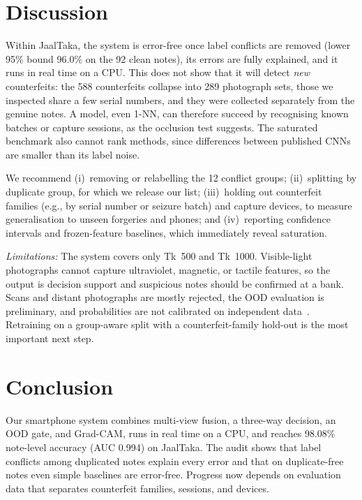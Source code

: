 \documentclass[journal,onecolumn]{IEEEtran}
\begin{document}
\FloatBarrier
\section{Discussion}
\label{sec:discussion}

Within JaalTaka, the system is error-free once label conflicts are removed (lower 95\%
bound 96.0\% on the 92 clean notes), its errors are fully explained, and it runs in real
time on a CPU. This does not show that it will detect \emph{new} counterfeits: the 588
counterfeits collapse into 289 photograph sets, those we inspected share a few serial
numbers, and they were collected separately from the genuine notes. A model, even 1-NN,
can therefore succeed by recognising known batches or capture sessions, as the occlusion
test suggests. The saturated benchmark also cannot rank methods, since differences
between published CNNs are smaller than its label noise.

We recommend (i)~removing or relabelling the 12 conflict groups; (ii)~splitting by
duplicate group, for which we release our list; (iii)~holding out counterfeit families
(e.g., by serial number or seizure batch) and capture devices, to measure generalisation
to unseen forgeries and phones; and (iv)~reporting confidence intervals and
frozen-feature baselines, which immediately reveal saturation.

\textit{Limitations:} The system covers only Tk~500 and Tk~1000. Visible-light
photographs cannot capture ultraviolet, magnetic, or tactile features, so the output is
decision support and suspicious notes should be confirmed at a bank. Scans and distant
photographs are mostly rejected, the OOD evaluation is preliminary, and probabilities
are not calibrated on independent data~\cite{guo2017calibration}. Retraining on a
group-aware split with a counterfeit-family hold-out is the most important next step.

\section{Conclusion}
\label{sec:conclusion}

Our smartphone system combines multi-view fusion, a three-way decision, an OOD gate, and
Grad-CAM, runs in real time on a CPU, and reaches 98.08\% note-level accuracy (AUC 0.994)
on JaalTaka. The audit shows that label conflicts among duplicated notes explain every
error and that on duplicate-free notes even simple baselines are error-free. Progress now
depends on evaluation data that separates counterfeit families, sessions, and devices.
\end{document}
